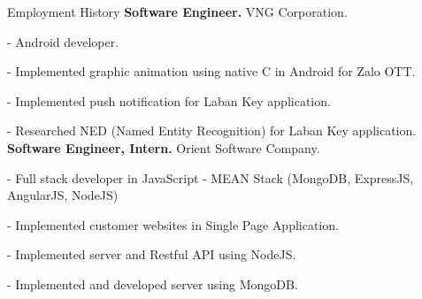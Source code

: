\begin{rubric}{Employment History}
\entry*[03/2016 --  03/2017]%
	\textbf{Software Engineer.} VNG Corporation. \par
	- Android developer. \par 
	- Implemented graphic animation using native C in Android for Zalo OTT.\par
	- Implemented push notification for Laban Key application. \par 
	- Researched NED (Named Entity Recognition) for Laban Key application. 
%
%
\entry*[05/2015 -- 07/2015]%
	\textbf{Software Engineer, Intern.} Orient Software Company. \par 
	- Full stack developer in JavaScript - MEAN Stack (MongoDB, ExpressJS, AngularJS, NodeJS) \par
	- Implemented customer websites in Single Page Application. \par 
	- Implemented server and Restful API using NodeJS. \par 
	- Implemented and developed server using MongoDB.\par 

%
\end{rubric}